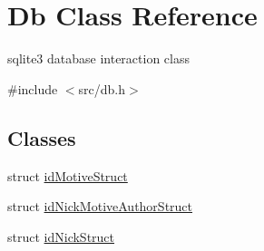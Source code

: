 \hypertarget{class_db}{
\section{Db Class Reference}
\label{class_db}
}


sqlite3 database interaction class  




{\ttfamily \#include $<$src/db.h$>$}

\subsection*{Classes}
\begin{DoxyCompactItemize}
\item 
struct \hyperlink{struct_db_1_1id_motive_struct}{idMotiveStruct}
\item 
struct \hyperlink{struct_db_1_1id_nick_motive_author_struct}{idNickMotiveAuthorStruct}
\item 
struct \hyperlink{struct_db_1_1id_nick_struct}{idNickStruct}
\end{DoxyCompactItemize}
